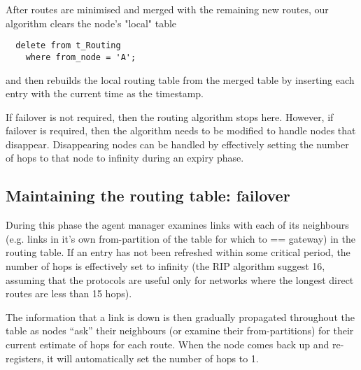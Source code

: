 \documentclass{cmspaper}
\begin{document}
After routes are minimised and merged with the remaining new routes, our algorithm clears the node's "local" table

{\small\begin{verbatim}
  delete from t_Routing
    where from_node = 'A';
\end{verbatim}}

and then rebuilds the local routing table from the merged table by inserting each entry with the current time as the timestamp.

If failover is not required, then the routing algorithm stops here.
However, if failover is required, then the algorithm needs to be
modified to handle nodes that disappear.  Disappearing nodes can be
handled by effectively setting the number of hops to that node to
infinity during an expiry phase.

\subsection{Maintaining the routing table: failover}
During this phase the agent manager examines links with each of its
neighbours (e.g. links in it's own from-partition of the table for
which to == gateway) in the routing table.  If an entry has not been
refreshed within some critical period, the number of hops is
effectively set to infinity (the RIP algorithm suggest 16, assuming
that the protocols are useful only for networks where the longest
direct routes are less than 15 hops).

The information that a link is down is then gradually propagated
throughout the table as nodes ``ask'' their neighbours (or examine
their from-partitions) for their current estimate of hops for each
route.  When the node comes back up and re-registers, it will
automatically set the number of hops to 1.
\end{document}
